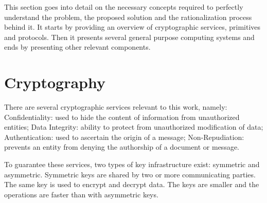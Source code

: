 \cleardoublepage
\label{chap:background}

This section goes into detail on the necessary concepts required to perfectly understand the problem, the proposed solution and the rationalization process behind it. It starts by providing an overview of cryptographic services, primitives and protocols. Then it presents several general purpose computing systems and ends by presenting other relevant components.

\section{Cryptography}\label{chap:background:crypto}

There are several cryptographic services relevant to this work, namely: Confidentiality: used to hide the content of information from unauthorized entities; Data Integrity: ability to protect from unauthorized modification of data; Authentication: used to ascertain the origin of a message; Non-Repudiation: prevents an entity from denying the authorship of a document or message.

To guarantee these services, two types of key infrastructure exist: symmetric and asymmetric.
Symmetric keys are shared by two or more communicating parties. The same key is used to encrypt and decrypt data. The keys are smaller and the operations are faster than with asymmetric keys.

